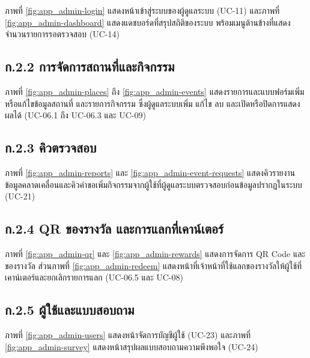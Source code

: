ภาพที่ \ref{fig:app_admin-login} แสดงหน้าเข้าสู่ระบบของผู้ดูแลระบบ (UC-11) และภาพที่ \ref{fig:app_admin-dashboard} แสดงแดชบอร์ดที่สรุปสถิติของระบบ พร้อมเมนูด้านข้างที่แสดงจำนวนรายการรอตรวจสอบ (UC-14)


\subsection*{ก.2.2 การจัดการสถานที่และกิจกรรม}

ภาพที่ \ref{fig:app_admin-places} ถึง \ref{fig:app_admin-events} แสดงรายการและแบบฟอร์มเพิ่มหรือแก้ไขข้อมูลสถานที่ และรายการกิจกรรม ซึ่งผู้ดูแลระบบเพิ่ม แก้ไข ลบ และเปิดหรือปิดการแสดงผลได้ (UC-06.1 ถึง UC-06.3 และ UC-09)


\subsection*{ก.2.3 คิวตรวจสอบ}

ภาพที่ \ref{fig:app_admin-reports} และ \ref{fig:app_admin-event-requests} แสดงคิวรายงานข้อมูลคลาดเคลื่อนและคิวคำขอเพิ่มกิจกรรมจากผู้ใช้ที่ผู้ดูแลระบบตรวจสอบก่อนข้อมูลปรากฏในระบบ (UC-21)


\subsection*{ก.2.4 QR ของรางวัล และการแลกที่เคาน์เตอร์}

ภาพที่ \ref{fig:app_admin-qr} และ \ref{fig:app_admin-rewards} แสดงการจัดการ QR Code และของรางวัล ส่วนภาพที่ \ref{fig:app_admin-redeem} แสดงหน้าที่เจ้าหน้าที่ใช้แลกของรางวัลให้ผู้ใช้ที่เคาน์เตอร์และยกเลิกรายการแลก (UC-06.5 และ UC-08)


\subsection*{ก.2.5 ผู้ใช้และแบบสอบถาม}

ภาพที่ \ref{fig:app_admin-users} แสดงหน้าจัดการบัญชีผู้ใช้ (UC-23) และภาพที่ \ref{fig:app_admin-survey} แสดงหน้าสรุปผลแบบสอบถามความพึงพอใจ (UC-24)

